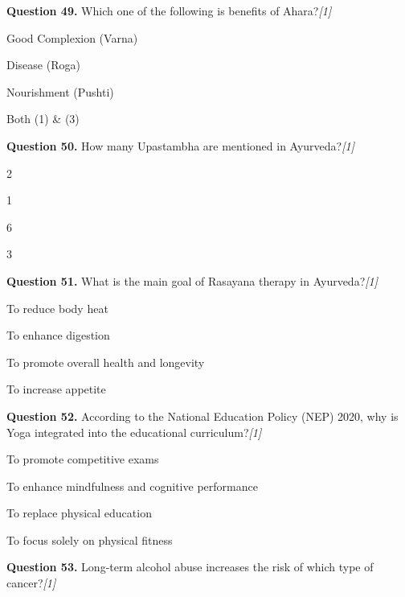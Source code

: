 \documentclass[11pt,a4paper]{article}
\newcommand{\pts}[1]{\hfill   \textit{[#1]}}
\begin{document}
\medskip


\noindent   \textbf{Question 49.} Which one of the following is benefits of Ahara?\pts{1}

\begin{parts}
  \item Good Complexion (Varna)
  \item Disease (Roga)
  \item Nourishment (Pushti)
  \item Both (1) & (3)
\end{parts}

\medskip


\noindent   \textbf{Question 50.} How many Upastambha are mentioned in Ayurveda?\pts{1}

\begin{parts}
  \item 2
  \item 1
  \item 6
  \item 3
\end{parts}

\medskip


\noindent   \textbf{Question 51.} What is the main goal of Rasayana therapy in Ayurveda?\pts{1}

\begin{parts}
  \item To reduce body heat
  \item To enhance digestion
  \item To promote overall health and longevity
  \item To increase appetite
\end{parts}

\medskip


\noindent   \textbf{Question 52.} According to the National Education Policy (NEP) 2020, why is Yoga integrated into the educational curriculum?\pts{1}

\begin{parts}
  \item To promote competitive exams
  \item To enhance mindfulness and cognitive performance
  \item To replace physical education
  \item To focus solely on physical fitness
\end{parts}

\medskip


\noindent   \textbf{Question 53.} Long-term alcohol abuse increases the risk of which type of cancer?\pts{1}
\end{document}
